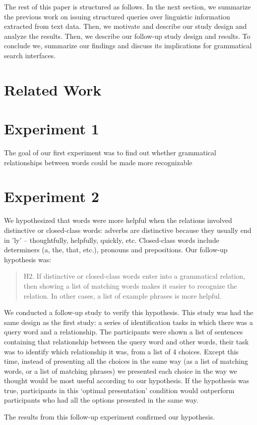 \documentclass{sigchi}
\begin{document}
The rest of this paper is structured as follows. In the next section, we summarize the previous work on issuing structured queries over linguistic information extracted from text data. Then, we motivate and describe our study design and analyze the results. Then, we describe our follow-up study design and results. To conclude we, summarize our findings and discuss its implications for grammatical search interfaces.

\section{Related Work}

\section{Experiment 1}

The goal of our first experiment was to find out whether grammatical relationships between words could be made more recognizable 




\section{Experiment 2}
We hypothesized that words were more helpful when the relations involved distinctive or closed-class words: adverbs are distinctive because they usually end in 'ly' -- thoughtfully, helpfully, quickly, etc. Closed-class words include determiners (a, the, that, etc.), pronouns and prepositions.  Our follow-up hypothesis was:

\begin{quote}
	H2. If distinctive or closed-class words enter into a grammatical relation, then showing a list of matching words makes it easier to recognize the relation. In other cases, a list of example phrases is more helpful.
\end{quote}

We conducted a follow-up study to verify this hypothesis. This study was had the same design as the first study: a series of identification tasks in which there was a query word and a relationship. The participants  were shown a list of sentences containing that relationship between the query word and other words, their task was to identify which relationship it was, from a list of 4 choices. Except this time, instead of presenting all the choices in the same way (as a list of matching words, or a list of matching phrases) we presented each choice in the way we thought would be most useful according to our hypothesis. If the hypothesis was true, participants in this `optimal presentation' condition would outperform participants who had all the options presented in the same way.

The results from this follow-up experiment  confirmed our hypothesis.







\end{document}
